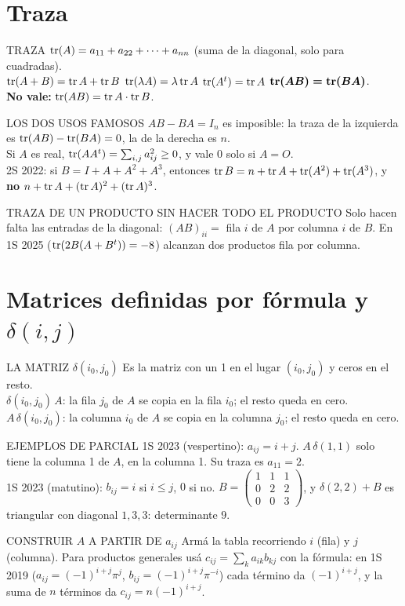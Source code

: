 \section{Traza}
\begin{sello}{TRAZA}
$\operatorname{tr}(A)=a_{11}+a_{22}+\cdots+a_{nn}$ (suma de la diagonal, solo para cuadradas).\\[2pt]
$\operatorname{tr}(A+B)=\operatorname{tr} A+\operatorname{tr} B$ \quad $\operatorname{tr}(\lambda A)=\lambda\operatorname{tr} A$ \quad $\operatorname{tr}(A^t)=\operatorname{tr} A$ \quad $\boldsymbol{\operatorname{tr}(AB)=\operatorname{tr}(BA)}$.\\[2pt]
\textbf{No vale:} $\operatorname{tr}(AB)=\operatorname{tr} A\cdot\operatorname{tr} B$.
\end{sello}
\begin{memo}{LOS DOS USOS FAMOSOS}
$AB-BA=I_n$ es imposible: la traza de la izquierda es $\operatorname{tr}(AB)-\operatorname{tr}(BA)=0$, la de la derecha es $n$.\\[2pt]
Si $A$ es real, $\operatorname{tr}(AA^t)=\sum_{i,j}a_{ij}^2\ge0$, y vale $0$ solo si $A=O$.\\[2pt]
2S 2022: si $B=I+A+A^2+A^3$, entonces $\operatorname{tr} B=n+\operatorname{tr} A+\operatorname{tr}(A^2)+\operatorname{tr}(A^3)$, y \textbf{no} $n+\operatorname{tr} A+(\operatorname{tr} A)^2+(\operatorname{tr} A)^3$.
\end{memo}
\begin{metodo}{TRAZA DE UN PRODUCTO SIN HACER TODO EL PRODUCTO}
Solo hacen falta las entradas de la diagonal: $(AB)_{ii}=$ fila $i$ de $A$ por columna $i$ de $B$. En 1S 2025 ($\operatorname{tr}(2B(A+B^t))=-8$) alcanzan dos productos fila por columna.
\end{metodo}

\section{Matrices definidas por fórmula y $\delta(i,j)$}
\begin{sello}{LA MATRIZ $\delta(i_0,j_0)$}
Es la matriz con un 1 en el lugar $(i_0,j_0)$ y ceros en el resto.\\[2pt]
$\delta(i_0,j_0)\,A$: la fila $j_0$ de $A$ se copia en la fila $i_0$; el resto queda en cero.\\
$A\,\delta(i_0,j_0)$: la columna $i_0$ de $A$ se copia en la columna $j_0$; el resto queda en cero.
\end{sello}
\begin{memo}{EJEMPLOS DE PARCIAL}
1S 2023 (vespertino): $a_{ij}=i+j$. $A\,\delta(1,1)$ solo tiene la columna 1 de $A$, en la columna 1. Su traza es $a_{11}=2$.\\[2pt]
1S 2023 (matutino): $b_{ij}=i$ si $i\le j$, $0$ si no. $B=\begin{pmatrix}1&1&1\\0&2&2\\0&0&3\end{pmatrix}$, y $\delta(2,2)+B$ es triangular con diagonal $1,3,3$: determinante $9$.
\end{memo}
\begin{metodo}{CONSTRUIR $A$ A PARTIR DE $a_{ij}$}
Armá la tabla recorriendo $i$ (fila) y $j$ (columna). Para productos generales usá $c_{ij}=\sum_k a_{ik}b_{kj}$ con la fórmula: en 1S 2019 ($a_{ij}=(-1)^{i+j}\pi^j$, $b_{ij}=(-1)^{i+j}\pi^{-i}$) cada término da $(-1)^{i+j}$, y la suma de $n$ términos da $c_{ij}=n(-1)^{i+j}$.
\end{metodo}

